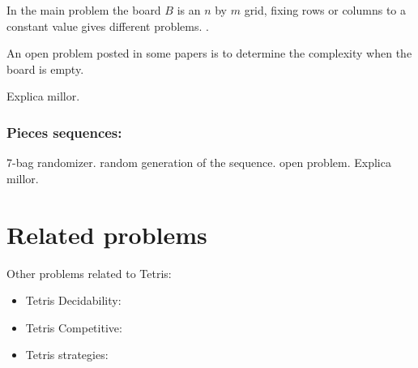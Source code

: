 In the main problem the board $B$ is an $n$ by $m$ grid, fixing rows or columns to a constant value gives different problems. \cite{TCB}.


An open problem posted in some papers is to determine the complexity when the board is empty.

Explica millor.

\subsubsection{Pieces sequences:}

7-bag randomizer. random generation of the sequence. open problem. Explica millor.


\section{Related problems}

Other problems related to Tetris:

\begin{itemize}
  \item Tetris Decidability: \cite{TAD}
  \item Tetris Competitive:  \cite{TINC}
  \item Tetris strategies:  \cite{TINC}
\end{itemize}
